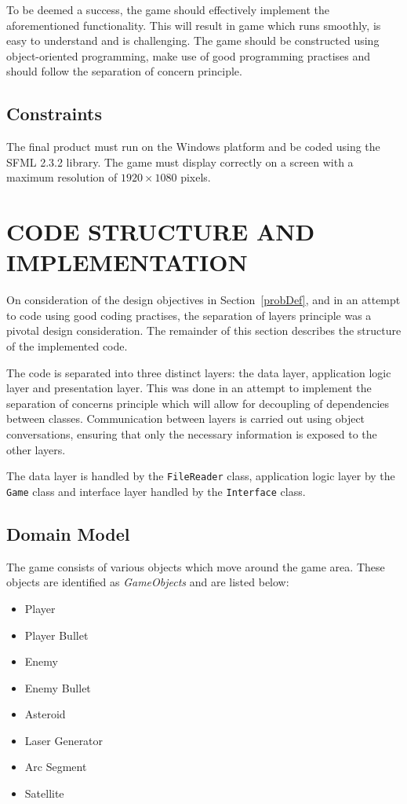 \documentclass[10pt,twocolumn]{witseiepaper}
\begin{document}
To be deemed a success, the game should effectively implement the aforementioned functionality. This will result in game which runs smoothly, is easy to understand and is challenging. The game should be constructed using object-oriented programming, make use of good programming practises and should follow the separation of concern principle. 

\subsection{Constraints}

The final product must run on the Windows platform and be coded using the SFML 2.3.2 library. The game must display correctly on a screen with a maximum resolution of $1920 \times 1080$ pixels.

\section{CODE STRUCTURE AND IMPLEMENTATION}

On consideration of the design objectives in Section~\ref{probDef}, and in an attempt to code using good coding practises, the separation of layers principle was a pivotal design consideration. The remainder of this section describes the structure of the implemented code.

The code is separated into three distinct layers: the data layer, application logic layer and presentation layer. This was done in an attempt to implement the separation of concerns principle which will allow for decoupling of dependencies between classes. Communication between layers is carried out using object conversations, ensuring that only the necessary information is exposed to the other layers.

The data layer is handled by the \texttt{FileReader} class, application logic layer by the \texttt{Game} class and interface layer handled by the \texttt{Interface} class.

\subsection{Domain Model}

The game consists of various objects which move around the game area. These objects are identified as \textit{GameObjects} and are listed below:
\begin{itemize}
	\item Player
	\item Player Bullet
	\item Enemy
	\item Enemy Bullet
	\item Asteroid
	\item Laser Generator
	\item Arc Segment
	\item Satellite
\end{itemize}
\end{document}
